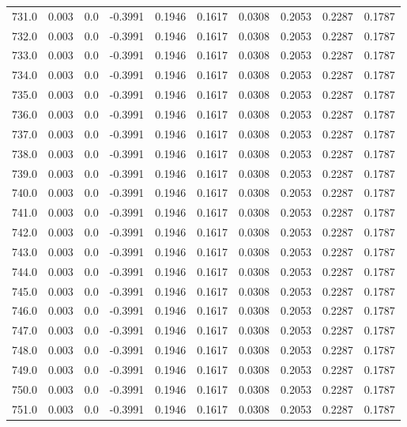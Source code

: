 \begin{longtable}{lrrrrrrrrr}
731.0 & 0.003 & 0.0 & -0.3991 & 0.1946 & 0.1617 & 0.0308 & 0.2053 & 0.2287 & 0.1787 \\
732.0 & 0.003 & 0.0 & -0.3991 & 0.1946 & 0.1617 & 0.0308 & 0.2053 & 0.2287 & 0.1787 \\
733.0 & 0.003 & 0.0 & -0.3991 & 0.1946 & 0.1617 & 0.0308 & 0.2053 & 0.2287 & 0.1787 \\
734.0 & 0.003 & 0.0 & -0.3991 & 0.1946 & 0.1617 & 0.0308 & 0.2053 & 0.2287 & 0.1787 \\
735.0 & 0.003 & 0.0 & -0.3991 & 0.1946 & 0.1617 & 0.0308 & 0.2053 & 0.2287 & 0.1787 \\
736.0 & 0.003 & 0.0 & -0.3991 & 0.1946 & 0.1617 & 0.0308 & 0.2053 & 0.2287 & 0.1787 \\
737.0 & 0.003 & 0.0 & -0.3991 & 0.1946 & 0.1617 & 0.0308 & 0.2053 & 0.2287 & 0.1787 \\
738.0 & 0.003 & 0.0 & -0.3991 & 0.1946 & 0.1617 & 0.0308 & 0.2053 & 0.2287 & 0.1787 \\
739.0 & 0.003 & 0.0 & -0.3991 & 0.1946 & 0.1617 & 0.0308 & 0.2053 & 0.2287 & 0.1787 \\
740.0 & 0.003 & 0.0 & -0.3991 & 0.1946 & 0.1617 & 0.0308 & 0.2053 & 0.2287 & 0.1787 \\
741.0 & 0.003 & 0.0 & -0.3991 & 0.1946 & 0.1617 & 0.0308 & 0.2053 & 0.2287 & 0.1787 \\
742.0 & 0.003 & 0.0 & -0.3991 & 0.1946 & 0.1617 & 0.0308 & 0.2053 & 0.2287 & 0.1787 \\
743.0 & 0.003 & 0.0 & -0.3991 & 0.1946 & 0.1617 & 0.0308 & 0.2053 & 0.2287 & 0.1787 \\
744.0 & 0.003 & 0.0 & -0.3991 & 0.1946 & 0.1617 & 0.0308 & 0.2053 & 0.2287 & 0.1787 \\
745.0 & 0.003 & 0.0 & -0.3991 & 0.1946 & 0.1617 & 0.0308 & 0.2053 & 0.2287 & 0.1787 \\
746.0 & 0.003 & 0.0 & -0.3991 & 0.1946 & 0.1617 & 0.0308 & 0.2053 & 0.2287 & 0.1787 \\
747.0 & 0.003 & 0.0 & -0.3991 & 0.1946 & 0.1617 & 0.0308 & 0.2053 & 0.2287 & 0.1787 \\
748.0 & 0.003 & 0.0 & -0.3991 & 0.1946 & 0.1617 & 0.0308 & 0.2053 & 0.2287 & 0.1787 \\
749.0 & 0.003 & 0.0 & -0.3991 & 0.1946 & 0.1617 & 0.0308 & 0.2053 & 0.2287 & 0.1787 \\
750.0 & 0.003 & 0.0 & -0.3991 & 0.1946 & 0.1617 & 0.0308 & 0.2053 & 0.2287 & 0.1787 \\
751.0 & 0.003 & 0.0 & -0.3991 & 0.1946 & 0.1617 & 0.0308 & 0.2053 & 0.2287 & 0.1787 \\

\end{longtable}
